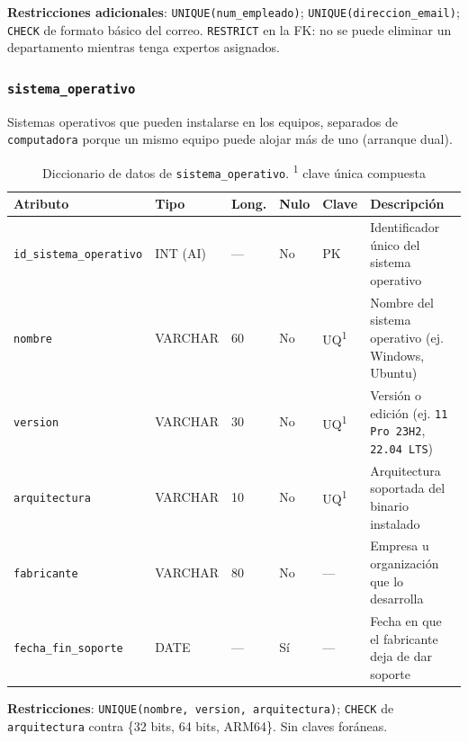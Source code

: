 \documentclass[10pt,a4paper]{article}
\begin{document}
\textbf{Restricciones adicionales}: \texttt{UNIQUE(num\_empleado)}; \texttt{UNIQUE(direccion\_email)}; \texttt{CHECK} de formato básico del correo. \texttt{RESTRICT} en la FK: no se puede eliminar un departamento mientras tenga expertos asignados.

\subsubsection{\texttt{sistema\_operativo}}

Sistemas operativos que pueden instalarse en los equipos, separados de \texttt{computadora} porque un mismo equipo puede alojar más de uno (arranque dual).

\begin{table}[H]
	\centering
	\footnotesize
	\begin{tabular}{p{3.1cm} | p{1.6cm} | p{0.8cm} | p{0.7cm} | p{1cm} | p{7cm}}\hline \hline
		\textbf{Atributo} & \textbf{Tipo} & \textbf{Long.} & \textbf{Nulo} & \textbf{Clave} & \textbf{Descripción} \\ \hline \hline
		\texttt{id\_sistema\_operativo} & INT (AI) & --- & No & PK & Identificador único del sistema operativo \\ \hline
		\texttt{nombre} & VARCHAR & 60 & No & UQ\textsuperscript{1} & Nombre del sistema operativo (ej. Windows, Ubuntu) \\ \hline
		\texttt{version} & VARCHAR & 30 & No & UQ\textsuperscript{1} & Versión o edición (ej. \texttt{11 Pro 23H2}, \texttt{22.04 LTS}) \\ \hline
		\texttt{arquitectura} & VARCHAR & 10 & No & UQ\textsuperscript{1} & Arquitectura soportada del binario instalado \\ \hline
		\texttt{fabricante} & VARCHAR & 80 & No & --- & Empresa u organización que lo desarrolla \\ \hline
		\texttt{fecha\_fin\_soporte} & DATE & --- & Sí & --- & Fecha en que el fabricante deja de dar soporte \\ \hline \hline
	\end{tabular}
	\caption{Diccionario de datos de \texttt{sistema\_operativo}. \textsuperscript{1} clave única compuesta}
	\label{tabla:dic-so}
\end{table}

\textbf{Restricciones}: \texttt{UNIQUE(nombre, version, arquitectura)}; \texttt{CHECK} de \texttt{arquitectura} contra \{32 bits, 64 bits, ARM64\}. Sin claves foráneas.
\end{document}
